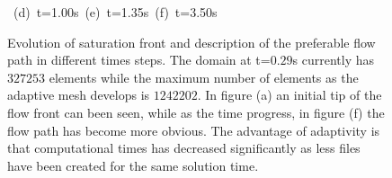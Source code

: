 \begin{landscape}
\begin{figure}[ht]
{      \hbox{\hspace{2.cm} (d) t=1.00s \hspace{5.cm} (e) t=1.35s\hspace{4.cm} (f) t=3.50s  } }
\caption{Evolution of saturation front and description of the preferable flow path in different times steps. The domain at t=$0.29$s currently has $327253$ elements while the maximum number of elements as the adaptive mesh develops is $1242202$. In figure (a) an initial tip of the flow front can been seen, while as the time progress, in figure (f) the flow path has become more obvious. The advantage of adaptivity is that computational times has decreased significantly as less files have been created for the same solution time.}
\label{fig:3DChannel_sat}
\end{figure}
\end{landscape}
\clearpage

